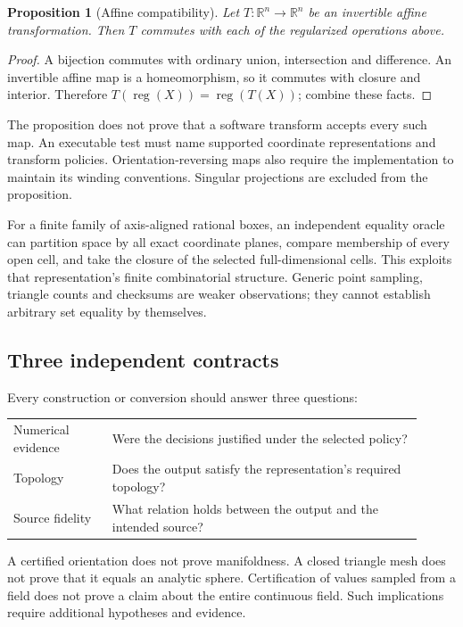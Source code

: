 \documentclass[11pt]{article}
\newtheorem{proposition}{Proposition}
\newcommand{\reg}{\operatorname{reg}}
\begin{document}
\begin{proposition}[Affine compatibility]
Let $T:\mathbb R^n\to\mathbb R^n$ be an invertible affine transformation.
Then $T$ commutes with each of the regularized operations above.
\end{proposition}
\begin{proof}
A bijection commutes with ordinary union, intersection and difference. An
invertible affine map is a homeomorphism, so it commutes with closure and
interior. Therefore $T(\reg(X))=\reg(T(X))$; combine these facts.
\end{proof}

The proposition does not prove that a software transform accepts every such
map. An executable test must name supported coordinate representations and
transform policies. Orientation-reversing maps also require the implementation
to maintain its winding conventions. Singular projections are excluded from
the proposition.

For a finite family of axis-aligned rational boxes, an independent equality
oracle can partition space by all exact coordinate planes, compare membership
of every open cell, and take the closure of the selected full-dimensional
cells. This exploits that representation's finite combinatorial structure.
Generic point sampling, triangle counts and checksums are weaker observations;
they cannot establish arbitrary set equality by themselves.

\subsection{Three independent contracts}
Every construction or conversion should answer three questions:
\begin{center}
\begin{tabular}{p{0.22\linewidth}p{0.69\linewidth}}
\toprule
Numerical evidence & Were the decisions justified under the selected policy?\\
Topology & Does the output satisfy the representation's required topology?\\
Source fidelity & What relation holds between the output and the intended source?\\
\bottomrule
\end{tabular}
\end{center}
A certified orientation does not prove manifoldness. A closed triangle mesh does
not prove that it equals an analytic sphere. Certification of values sampled
from a field does not prove a claim about the entire continuous field. Such
implications require additional hypotheses and evidence.
\end{document}
